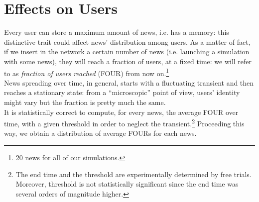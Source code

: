 \section{Effects on Users} \label{sec:users}
Every user can store a maximum amount of news, i.e. has a memory: this
distinctive trait could affect news' distribution among users.
As a matter of fact, if we insert in the network a certain number
of news (i.e. launching a simulation with some news),
they will reach a fraction of users, at a fixed time:
we will refer to as \textit{fraction of users reached} (FOUR)
from now on.\footnote{20 news for all of our simulations.}\\
News spreading over time, in general, starts with a fluctuating
transient and then reaches a stationary state: from a ``microscopic''
point of view, users' identity might vary but the fraction is
pretty much the same.\\
It is statistically correct to compute, for every news, the average
FOUR over time, with a given threshold in order to
neglect the transient.\footnote{The end time and the threshold are
  experimentally determined by free trials. Moreover, threshold is
  not statistically significant since the end time was several
  orders of magnitude higher.}
Proceeding this way, we obtain a distribution of average FOURs
for each news.\\

